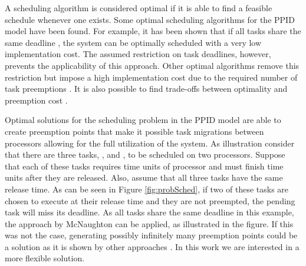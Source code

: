 \documentclass[twocolumn, compsocconf]{IEEEtran}
\newlength{\execWidth}
\newcounter{proc}
\begin{document}
A scheduling algorithm is considered optimal if it is able to find a feasible
schedule whenever one exists. Some optimal scheduling algorithms for the PPID
model have been found. For example, it has been shown that if all tasks share
the same deadline \cite{McNaughton59}, the system can be optimally scheduled
with a very low implementation cost. The assumed restriction on task deadlines,
however, prevents the applicability of this approach. Other optimal algorithms
remove this restriction but impose a high implementation cost due to the
required number of task preemptions \cite{Baruah96, Cho06, Levin2010}. It is
also possible to find trade-offs between optimality and preemption cost
\cite{Andersson08, Massa10, Andersson08b, Bletsas09}.

Optimal solutions for the scheduling problem in the PPID model are able to
create preemption points that make it possible task migrations between
processors allowing for the full utilization of the system. As illustration
consider that there are three tasks, ,  and , to be
scheduled on two processors. Suppose that each of these tasks requires  time
units of processor and must finish  time units after they are released.
Also, assume that all three tasks have the same release time. As can be seen in
Figure \ref{fig:probSched}, if two of these tasks are chosen to execute at their
release time and they are not preempted, the pending task will miss its
deadline. As all tasks share the same deadline in this example, the approach by
McNaughton \cite{McNaughton59} can be applied, as illustrated in the figure. If
this was not the case, generating possibly infinitely many preemption points
could be a solution as it is shown by other approaches \cite{Baruah96, Cho06,
  Levin2010}. In this work we are interested in a more flexible solution.

\setlength{\execWidth}{0.37\psyunit}
\end{document}
